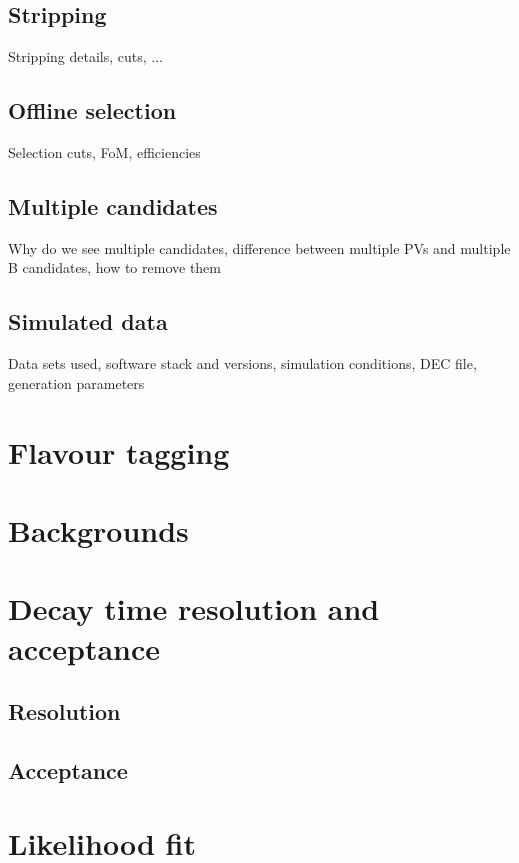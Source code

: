\subsection{Stripping}
\label{sec:measurement_of_sin2beta:data_preparation:stripping}
Stripping details, cuts, ...

\subsection{Offline selection}
\label{sec:measurement_of_sin2beta:data_preparation:offline_selection}
Selection cuts, FoM, efficiencies

\subsection{Multiple candidates}
Why do we see multiple candidates, difference between multiple PVs and multiple B candidates, how to remove them

\subsection{Simulated data}
Data sets used, software stack and versions, simulation conditions, DEC file, generation parameters

\section{Flavour tagging}
\label{sec:measurement_of_sin2beta:flavour_tagging}
\section{Backgrounds}
\label{sec:measurement_of_sin2beta:physic_backgrounds}
\section{Decay time resolution and acceptance}
\label{sec:measurement_of_sin2beta:resolution_and_acceptance}
\subsection{Resolution}
\label{sec:measurement_of_sin2beta:resolution_and_acceptance:resolution}
\subsection{Acceptance}
\label{sec:measurement_of_sin2beta:resolution_and_acceptance:acceptance}
\section{Likelihood fit}
